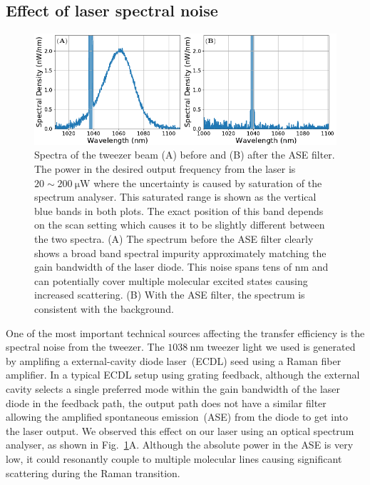 \subsection{Effect of laser spectral noise}
\label{ch:raman-transfer:results:ase}

\begin{figure}
  \centering
  \includegraphics[width=\textwidth]{figures/raman_transfer_spectra.pdf}
  \caption[Tweezer spectra before and after ASE filter]{
    Spectra of the tweezer beam (A) before and (B) after the ASE filter.
    The power in the desired output frequency from the laser is $20\sim200~\mathrm{\mu W}$
    where the uncertainty is caused by saturation of the spectrum analyser.
    This saturated range is shown as the vertical blue bands in both plots.
    The exact position of this band depends on the scan setting
    which causes it to be slightly different between the two spectra.
    (A) The spectrum before the ASE filter clearly shows a broad band spectral impurity
    approximately matching the gain bandwidth of the laser diode.
    This noise spans tens of nm and can potentially cover multiple molecular excited states
    causing increased scattering.
    (B) With the ASE filter, the spectrum is consistent with the background.
    \label{fig:raman-transfer:results:ase:spectra}}
\end{figure}

One of the most important technical sources affecting the transfer efficiency
is the spectral noise from the tweezer.
The $1038~\mathrm{nm}$ tweezer light we used is generated
by amplifing a external-cavity diode laser~(ECDL) seed using a Raman fiber amplifier.
In a typical ECDL setup using grating feedback,
although the external cavity selects a single preferred mode
within the gain bandwidth of the laser diode in the feedback path,
the output path does not have a similar filter
allowing the amplified spontaneous emission~(ASE)
from the diode to get into the laser output.
We observed this effect on our laser using an optical spectrum analyser,
as shown in Fig.~\ref{fig:raman-transfer:results:ase:spectra}A.
Although the absolute power in the ASE is very low,
it could resonantly couple to multiple molecular lines
causing significant scattering during the Raman transition.

